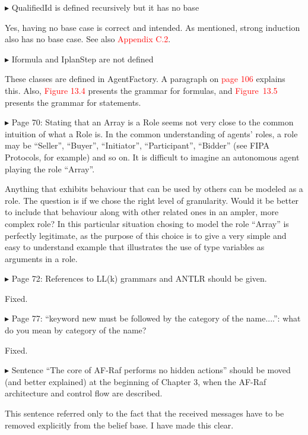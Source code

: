 \documentclass{article}
\newcommand*\R[1]{\textcolor{red}{#1}} %
\newenvironment{them}%
  {\bigskip\noindent\begingroup\color{blue}$\blacktriangleright$\enspace}%
  {\endgroup\par}
\begin{document}
\begin{them}
QualifiedId is defined recursively but it has no base
\end{them}
Yes, having no base case is correct and intended.
As mentioned, strong induction also has no base case.
See also \R{Appendix C.2}.


\begin{them}
Iformula and IplanStep are not defined
\end{them}
These classes are defined in AgentFactory. A paragraph on \R{page 106}  explains this.
Also, \R{Figure 13.4} presents the grammar for formulas, and \R{Figure~13.5}
presents the grammar for statements.

\begin{them}
Page 70:
Stating that an Array is a Role seems not very close to the common intuition of
what a Role is. In the common understanding of agents' roles, a role may be
``Seller'', ``Buyer'', ``Initiator'', ``Participant'', ``Bidder'' (see FIPA Protocols,
for example) and so on. It is difficult to imagine an autonomous agent playing
the role ``Array''.
\end{them}
Anything that exhibits behaviour that can be used by others can be modeled as a
role. The question is if we chose the right level of granularity. Would it be
better to include that behaviour along with other related ones in an ampler,
more complex role? In this particular situation chosing to model the role
``Array'' is perfectly legitimate, as the purpose of this choice is to give a
very simple and easy to understand example that illustrates the use of type
variables as arguments in a role.

\begin{them}
Page 72:
References to LL(k) grammars and ANTLR should be given.
\end{them}
Fixed.

\begin{them}
Page 77:
``keyword new must be followed by the category of the name....'': what do you
mean by category of the name?
\end{them}
Fixed.

\begin{them}
Sentence ``The core of AF-Raf performs no hidden actions'' should be moved (and
better explained) at the beginning of Chapter 3, when the AF-Raf architecture
and control flow are described.
\end{them}
This sentence referred only to the fact that the received messages have to be
removed explicitly from the belief base. I have made this clear.
\end{document}
